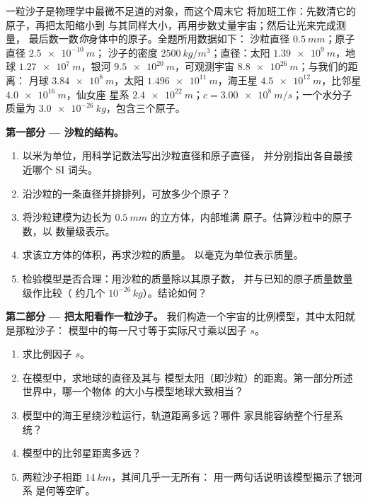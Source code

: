 \begin{problem}
\label{pb:g10:orders-of-magnitude:1}
一粒沙子是物理学中最微不足道的对象，而这个周末它
将加班工作：先数清它的原子，再把太阳缩小到
与其同样大小，再用步数丈量宇宙；然后让光来完成测量，
最后数一数\emph{你}身体中的原子。全题所用数据如下：
沙粒直径 $\qty{0.5}{mm}$；原子直径 $\qty{2.5e-10}{m}$；
沙子的密度 $\qty{2500}{kg/m^3}$；直径：太阳
$\qty{1.39e9}{m}$，地球 $\qty{1.27e7}{m}$，银河
$\qty{9.5e20}{m}$，可观测宇宙 $\qty{8.8e26}{m}$；与我们的距离：
月球 $\qty{3.84e8}{m}$，太阳 $\qty{1.496e11}{m}$，海王星
$\qty{4.5e12}{m}$，比邻星 $\qty{4.0e16}{m}$，仙女座
星系 $\qty{2.4e22}{m}$；$c = \qty{3.00e8}{m/s}$；一个水分子
质量为 $\qty{3.0e-26}{kg}$，包含三个原子。

\medskip
\noindent\textbf{第一部分 --- 沙粒的结构。}
\begin{enumerate}
  \item 以米为单位，用科学记数法写出沙粒直径和原子直径，
        并分别指出各自最接近哪个
        SI 词头。
  \item 沿沙粒的一条直径并排排列，可放多少个原子？
  \item 将沙粒建模为边长为 $\qty{0.5}{mm}$ 的立方体，内部堆满
        原子。估算沙粒中的原子数，以
        数量级表示。
  \item 求该立方体的体积，再求沙粒的质量。
        以毫克为单位表示质量。
  \item 检验模型是否合理：用沙粒的质量除以其原子数，
        并与已知的原子质量数量级作比较（
        约几个 $10^{-26}\,\unit{kg}$）。结论如何？
\end{enumerate}

\medskip
\noindent\textbf{第二部分 --- 把太阳看作一粒沙子。}
我们构造一个宇宙的比例模型，其中太阳就是那粒沙子：
模型中的每一尺寸等于实际尺寸乘以因子 $s$。
\begin{enumerate}[resume]
  \item 求比例因子 $s$。
  \item 在模型中，求地球的直径及其与
        模型太阳（即沙粒）的距离。第一部分所述世界中，哪一个物体
        的大小与模型地球大致相当？
  \item 模型中的海王星绕沙粒运行，轨道距离多远？哪件
        家具能容纳整个行星系统？
  \item 模型中的比邻星距离多远？
  \item 两粒沙子相距 $\qty{14}{km}$，其间几乎一无所有：
        用一两句话说明该模型揭示了银河系
        是何等空旷。
\end{enumerate}


\end{problem}
